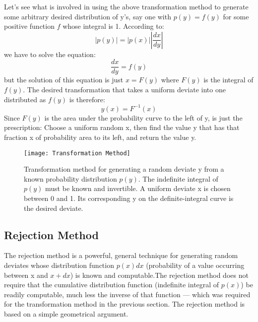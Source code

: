 Let’s see what is involved in using the above transformation method to generate some arbitrary desired distribution of y’s, say one with $p(y)=f(y)$ for some positive function $f$ whose integral is 1. According to:
\[\left | p(y)\right |= \left | p(x)\right | \left | \frac{dx}{dy} \right |\]
we have to solve the equation:
\[ \frac{dx}{dy} = f(y) \]
but the solution of this equation is just $x=F(y)$ where $F(y)$ is the integral of $f(y)$. The desired transformation that takes a uniform deviate into one distributed as $f(y)$ is therefore: 
\[ y(x)=F^{-1}(x) \]
Since $F(y)$ is the area under the probability curve to the left of y, is just the prescription:
Choose a uniform random x, then find the value y that has that fraction x of probability area to its left, and return the value y.

\begin{figure}[h!t]
\centering
\texttt{[image: Transformation Method]}
\caption{Transformation method for generating a random deviate y from a known probability distribution $p(y)$. The indefinite integral of $p(y)$ must be known and invertible. A uniform deviate x is chosen between 0 and 1. Its corresponding y on the definite-integral curve is the desired deviate.}\label{fig:Transformation method}
\end{figure}

\subsection{Rejection Method}
The rejection method is a powerful, general technique for generating random deviates whose distribution function $p(x)dx$ (probability of a value occurring between x and $x+dx$) is known and computable.The rejection method does not require that the cumulative distribution function (indefinite integral of $p(x)$) be readily computable, much less the inverse of that function — which was required for the transformation method in the previous section.
The rejection method is based on a simple geometrical argument.

\begin{figure}[h!t]
\centering
{}
\caption{}
\label{fig:Rejection method}
\end{figure}


